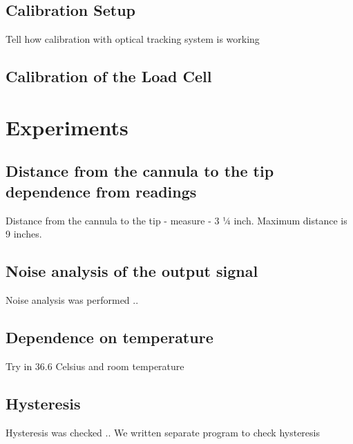 \subsection{Calibration Setup}
\label{sec:CalSetup}
Tell how calibration with optical tracking system is working

\subsection{Calibration of the Load Cell}
\label{sec:CalLoadCell}

\section{Experiments}
\label{sec:Experims}

\subsection{Distance from the cannula to the tip dependence from readings}
\label{sec:DisExp}
Distance from the cannula to the tip - measure - 3 ¼ inch. Maximum distance is 9 inches.

\subsection{Noise analysis of the output signal}
\label{sec:NoiseExp}
Noise analysis was performed ..

\subsection{Dependence on temperature}
\label{sec:TempExp}
Try in 36.6 Celsius and room temperature

\subsection{Hysteresis}
\label{sec:HystExp}
Hysteresis was checked .. 
We written separate program to check hysteresis

